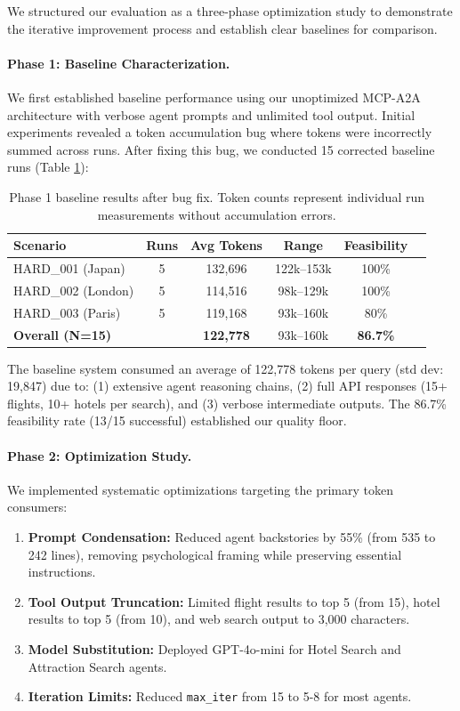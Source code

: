 \documentclass[10pt,twocolumn]{article}
\begin{document}
We structured our evaluation as a three-phase optimization study to demonstrate the iterative improvement process and establish clear baselines for comparison.

\paragraph{Phase 1: Baseline Characterization.}
We first established baseline performance using our unoptimized MCP-A2A architecture with verbose agent prompts and unlimited tool output. Initial experiments revealed a token accumulation bug where tokens were incorrectly summed across runs. After fixing this bug, we conducted 15 corrected baseline runs (Table \ref{tab:baseline_runs}):

\begin{table}[h]
\centering
\small
\begin{tabular}{lccccc}
\toprule
\textbf{Scenario} & \textbf{Runs} & \textbf{Avg Tokens} & \textbf{Range} & \textbf{Feasibility} \\
\midrule
HARD\_001 (Japan) & 5 & 132,696 & 122k--153k & 100\% \\
HARD\_002 (London) & 5 & 114,516 & 98k--129k & 100\% \\
HARD\_003 (Paris) & 5 & 119,168 & 93k--160k & 80\% \\
\midrule
\multicolumn{2}{l}{\textbf{Overall (N=15)}} & \textbf{122,778} & 93k--160k & \textbf{86.7\%} \\
\bottomrule
\end{tabular}
\caption{Phase 1 baseline results after bug fix. Token counts represent individual run measurements without accumulation errors.}
\label{tab:baseline_runs}
\end{table}

The baseline system consumed an average of 122,778 tokens per query (std dev: 19,847) due to: (1) extensive agent reasoning chains, (2) full API responses (15+ flights, 10+ hotels per search), and (3) verbose intermediate outputs. The 86.7\% feasibility rate (13/15 successful) established our quality floor.

\paragraph{Phase 2: Optimization Study.}
We implemented systematic optimizations targeting the primary token consumers:
\begin{enumerate}
    \item \textbf{Prompt Condensation:} Reduced agent backstories by 55\% (from 535 to 242 lines), removing psychological framing while preserving essential instructions.
    \item \textbf{Tool Output Truncation:} Limited flight results to top 5 (from 15), hotel results to top 5 (from 10), and web search output to 3,000 characters.
    \item \textbf{Model Substitution:} Deployed GPT-4o-mini for Hotel Search and Attraction Search agents.
    \item \textbf{Iteration Limits:} Reduced \texttt{max\_iter} from 15 to 5-8 for most agents.
\end{enumerate}
\end{document}
